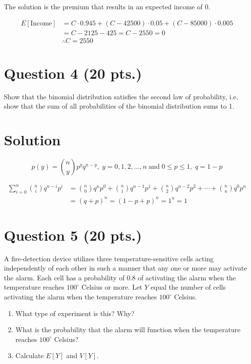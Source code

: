 \documentclass[11pt]{article}
\theoremstyle{definition}
\begin{document}
The solution is the premium that results in an expected income of 0.

$$
	\begin{aligned}
		E[\text{Income}] & = C \cdot 0.945 + (C - 42500) \cdot 0.05 + (C - 85000) \cdot 0.005 \\
		& = C - 2125 - 425 = C - 2550 = 0 \\
		& \therefore C = 2550
	\end{aligned}
$$

\newpage

\section*{Question 4 (20 pts.)}

Show that the binomial distribution satisfies the second law of probability, i.e. show that the sum of all probabilities of the binomial distribution sums to 1.

\section*{Solution}

$$
	p(y) = {n \choose y} p^y q^{n-y}, \; y = 0,1,2,\ldots,n \; \text{and} \; 0 \leq p \leq 1, \; q = 1-p
$$

$$
	\begin{aligned}
	\sum_{i=0}^n {n \choose i} q^{n-i}p^i & = {n \choose 0} q^n p^0 + {n \choose 1} q^{n-1}p^1 + {n \choose 2} q^{n-2}p^2 + \cdots + {n \choose n} q^0 p^n \\
	& = (q + p)^n = (1 - p + p)^n = 1^n = 1
	\end{aligned}
$$

\newpage

\section*{Question 5 (20 pts.)}

A fire-detection device utilizes three temperature-sensitive cells acting independently of each other in such a manner that any one or more may activate the alarm. Each cell has a probability of 0.8 of activating the alarm when the temperature reaches $100^\circ$ Celsius or more. Let $Y$ equal the number of cells activating the alarm when the temperature reaches $100^\circ$ Celsius.

\begin{enumerate}
	\item What type of experiment is this? Why?
	\item What is the probability that the alarm will function when the temperature reaches $100^\circ$ Celsius?
	\item Calculate $E[Y]$ and $V[Y]$.
\end{enumerate}
\end{document}
